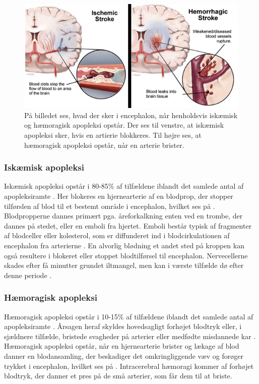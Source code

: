 \begin{figure}[H]
	\centering
	\includegraphics[scale=0.8]{figures/bProblemanalyse/haemoragisk_og_iskaemisk.png}
	\caption{På billedet ses, hvad der sker i encephalon, når henholdsvis iskæmisk og hæmoragisk apopleksi opstår. Der ses til venstre, at iskæmisk apopleksi sker, hvis en artierie blokkeres. Til højre ses, at hæmoragisk apopleksi opstår, når en arterie brister. \cite{Ritter2015}}
	\label{haem-isk}
\end{figure}

\subsubsection{Iskæmisk apopleksi}\label{IskaemiskApp}
Iskæmisk apopleksi opstår i 80-85\% af tilfældene iblandt det samlede antal af apopleksiramte \cite{Sundhed.dk2014}. Her blokeres en hjernearterie af en blodprop, der stopper tilførslen af blod til et bestemt område i encephalon, hvilket ses på . Blodpropperne dannes primært pga. åreforkalkning enten ved en trombe, der dannes på stedet, eller en emboli fra hjertet. \cite{Schulze2011} Emboli består typisk af fragmenter af blodceller eller kolesterol, som er diffunderet ind i blodcirkulationen af encephalon fra arterierne \cite{Academic2015a}. En alvorlig blødning et andet sted på kroppen kan også resultere i blokeret eller stoppet blodtilførsel til encephalon. \cite{Hjernesagen2015a} Nervecellerne skades efter få minutter grundet iltmangel, men kan i værste tilfælde dø efter denne periode \cite{Schulze2011,Giraldo2015}.%

\subsubsection{Hæmoragisk apopleksi}
Hæmoragisk apopleksi opstår i 10-15\% af tilfældene iblandt det samlede antal af apopleksiramte \cite{Sundhed.dk2014}. Årsagen heraf skyldes hovedsagligt forhøjet blodtryk eller, i sjældnere tilfælde, bristede svagheder på arterier eller medfødte misdannede kar \cite{Schulze2011}. Hæmoragisk apopleksi opstår, når en hjernearterie brister og lækage af blod danner en blodansamling, der beskadiger det omkringliggende væv og forøger trykket i encephalon, hvilket ses på . Intracerebral hæmoragi kommer af forhøjet blodtryk, der danner et pres på de små arterier, som får dem til at briste. \cite{Caplan2006}

